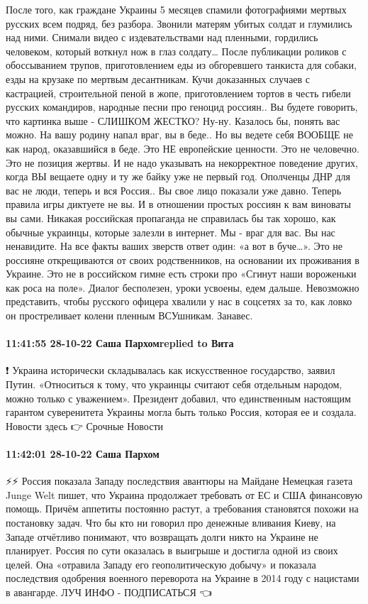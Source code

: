 После того, как граждане Украины 5 месяцев спамили фотографиями мертвых русских всем подряд, без разбора. Звонили матерям убитых солдат и глумились над ними. Снимали видео с издевательствами над пленными, гордились человеком, который воткнул нож в глаз солдату… После публикации роликов с обоссыванием трупов, приготовлением еды из обгоревшего танкиста для собаки, езды на крузаке по мертвым десантникам. Кучи доказанных случаев с кастрацией, строительной пеной в жопе, приготовлением тортов в честь гибели русских командиров, народные песни про геноцид россиян.. Вы будете говорить, что картинка выше - СЛИШКОМ ЖЕСТКО? Ну-ну.
Казалось бы, понять вас можно. На вашу родину напал враг, вы в беде.. Но вы ведете себя ВООБЩЕ не как народ, оказавшийся в беде. Это НЕ европейские ценности. Это не человечно. Это не позиция жертвы. И не надо указывать на некорректное поведение других, когда ВЫ вещаете одну и ту же байку уже не первый год. Ополченцы ДНР для вас не люди, теперь и вся Россия..
Вы свое лицо показали уже давно. Теперь правила игры диктуете не вы. И в отношении простых россиян к вам виноваты вы сами. Никакая российская пропаганда не справилась бы так хорошо, как обычные украинцы, которые залезли в интернет. Мы - враг для вас. Вы нас ненавидите. На все факты ваших зверств ответ один: «а вот в буче…».
Это не россияне открещиваются от своих родственников, на основании их проживания в Украине. Это не в российском гимне есть строки про «Сгинут наши вороженьки как роса на поле». Диалог бесполезен, уроки усвоены, едем дальше. Невозможно представить, чтобы русского офицера хвалили у нас в соцсетях за то, как ловко он простреливает колени пленным ВСУшникам. Занавес.

\paragraph{11:41:55 28-10-22 Саша Пархомreplied to Вита}

❗️ Украина исторически складывалась как искусственное государство, заявил Путин.
«Относиться к тому, что украинцы считают себя отдельным народом, можно только с уважением».
Президент добавил, что единственным настоящим гарантом суверенитета Украины могла быть только Россия, которая ее и создала.
Новости здесь 👉 Срочные Новости

\paragraph{11:42:01 28-10-22 Саша Пархом}

⚡️⚡️ Россия показала Западу последствия авантюры на Майдане
Немецкая газета Junge Welt пишет, что Украина продолжает требовать от ЕС и США финансовую помощь. Причём аппетиты постоянно растут, а требования становятся похожи на постановку задач. Что бы кто ни говорил про денежные вливания Киеву, на Западе отчётливо понимают, что возвращать долги никто на Украине не планирует.
Россия по сути оказалась в выигрыше и достигла одной из своих целей. Она «отравила Западу его геополитическую добычу» и показала последствия одобрения военного переворота на Украине в 2014 году с нацистами в авангарде.
ЛУЧ ИНФО - ПОДПИСАТЬСЯ 👈
